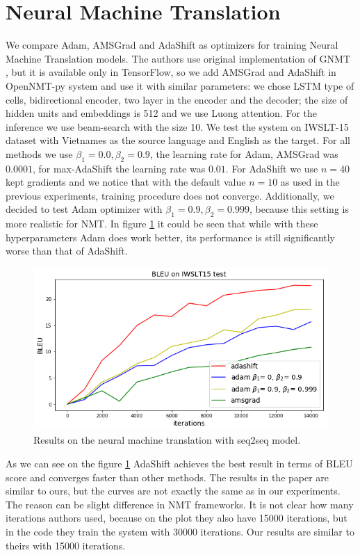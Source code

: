 \documentclass{article} %
\begin{document}
\section{Neural Machine Translation}
\label{others}
We compare Adam, AMSGrad and AdaShift as optimizers for training Neural Machine Translation models. The authors use original implementation of GNMT \citep{luong17}, but it is available only in TensorFlow, so we add AMSGrad and AdaShift in OpenNMT-py system \citep{opennmt} and use it with similar parameters: we chose LSTM type of cells, bidirectional encoder, two layer in the encoder and the decoder; the size of hidden units and embeddings is 512 and we use Luong attention. For the inference we use beam-search with the size 10. We test the system on IWSLT-15 dataset with Vietnames as the source language  and English as the target. For all methods we use $\beta_1=0.0, \beta_2=0.9$, the learning rate for Adam, AMSGrad was $0.0001$, for max-AdaShift  the learning rate  was $0.01$. For AdaShift we use $n = 40$ kept gradients and we notice that with the default value $n = 10$ as used in the previous experiments, training procedure does not converge. Additionally, we decided to test Adam optimizer with $\beta_1=0.9, \beta_2=0.999$, because this setting is more realistic for NMT. In figure \ref{fig:nmt}
it could be seen that while with these hyperparameters
Adam does work better, its performance is still
significantly worse than that of AdaShift.

\begin{figure}[t]
\centering
\includegraphics[width=.65\linewidth]{img/nmt_adam.png}
\caption{Results on the neural machine translation with seq2seq model.}
\label{fig:nmt}
\end{figure}

As we can see on the figure \ref{fig:nmt}  AdaShift achieves the best result in terms of BLEU score and converges faster than other methods. The results in the paper are similar to ours, but the curves are not exactly the same as in our experiments. The reason can be slight difference in NMT frameworks. It is not clear how many iterations authors used, because on the plot they also have 15000 iterations, but in the code they train the system with 30000 iterations. Our results are similar to theirs with 15000 iterations.
\end{document}
